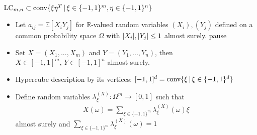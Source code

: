 \begin{frame}
\begin{block}{$   \textup{LC}_{m,n}  \subset \textup{conv} \{  \xi\eta^T \, | \, \xi \in \{-1,1\}^m, \eta \in \{-1,1\}^n     \} $}
	\begin{itemize}
		\item<1-> Let $ a_{ij} = \mathbb{E}[X_iY_j] $ for $ \mathbb{R} $-valued random variables $ (X_i),(Y_j) $ defined on a common probability space $ \Omega $ with $ {\left|{X_i}\right|},{\left|{Y_j}\right|} \le 1 $ almost surely. 
		pause
		\item <2->Set $ X= (X_1,...,X_m) $ and $ Y= (Y_1,...,Y_n) $, then $ X \in [-1,1]^m, \, Y \in [-1,1]^n $ almost surely.
		\item<3-> Hypercube description by its vertices: $ [-1,1]^d = \textup{conv} \{\xi \, | \, \xi \in \{-1,1 \}^d \}$ 
		\item<4-> Define random variables $ \lambda_{\xi}^{(X)}: \Omega^m \to [0,1] $ such that 
			\begin{align*}
			X(\omega) = \sum_{\xi \in \{-1,1\}^m}\lambda_{\xi}^{(X)}(\omega)\xi
			\end{align*} 
			almost surely 
			and $ \sum_{\xi \in \{-1,1\}^m}\lambda_{\xi}^{(X)}(\omega) = 1  $
	\end{itemize}
\end{block}
\end{frame}

